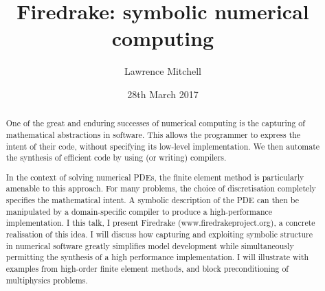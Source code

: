 \documentclass[presentation]{beamer}
\date{28th March 2017}
\author{Lawrence Mitchell\inst{1,*}}
\institute{
\inst{1}Departments of Computing and Mathematics, Imperial College
London

\inst{*}\texttt{lawrence.mitchell@imperial.ac.uk}
}
\title{Firedrake: symbolic numerical computing}
\begin{document}
\maketitle

\begin{abstract}
  One of the great and enduring successes of numerical computing is
  the capturing of mathematical abstractions in software.  This allows
  the programmer to express the intent of their code, without
  specifying its low-level implementation.  We then automate the
  synthesis of efficient code by using (or writing) compilers.

  In the context of solving numerical PDEs, the finite element method
  is particularly amenable to this approach.  For many problems, the
  choice of discretisation completely specifies the mathematical
  intent.  A symbolic description of the PDE can then be manipulated
  by a domain-specific compiler to produce a high-performance
  implementation.  I this talk, I present Firedrake
  (www.firedrakeproject.org), a concrete realisation of this idea.  I
  will discuss how capturing and exploiting symbolic structure in
  numerical software greatly simplifies model development while
  simultaneously permitting the synthesis of a high performance
  implementation.  I will illustrate with examples from high-order
  finite element methods, and block preconditioning of multiphysics
  problems.
\end{abstract}
\end{document}
